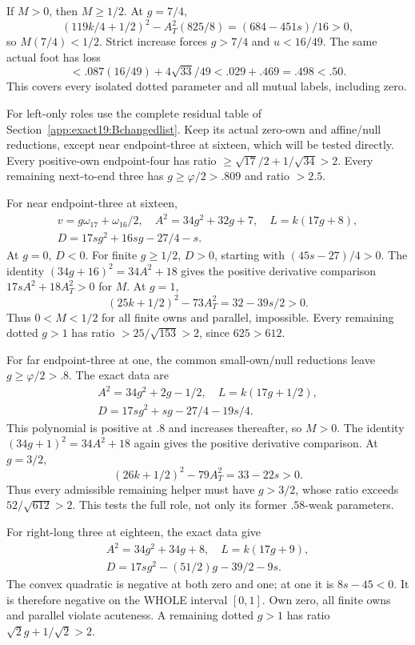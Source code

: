 \documentclass[11pt]{article}
\theoremstyle{definition}
\theoremstyle{remark}
\begin{document}
If \(M>0\), then \(M\ge1/2\).
At \(g=7/4\),
\[
 (119k/4+1/2)^2-A_T^2(825/8)
                         =(684-451s)/16>0 ,
\]
so \(M(7/4)<1/2\).
Strict increase forces \(g>7/4\)
and \(u<16/49\).
The same actual foot has loss
\[
          <.087(16/49)+4\sqrt{33}/49<.029+.469=.498<.50 .
\]
This covers every isolated dotted
parameter and all mutual labels,
including zero.

For left-only roles use the
complete residual table of
Section~\ref{app:exact19:Bchangedlist}.
Keep its actual zero-own and
affine/null reductions, except
near endpoint-three at sixteen,
which will be tested directly.
Every positive-own endpoint-four
has ratio
\(\ge\sqrt{17}/2+1/\sqrt{34}>2\).
Every remaining next-to-end
three has \(g\ge\varphi/2>.809\)
and ratio \(>2.5\).

For near endpoint-three at sixteen,
\[
\begin{gathered}
 v=g\omega_{17}+\omega_{16}/2,\quad
 A^2=34g^2+32g+7,\quad L=k(17g+8),\\
                   D=17sg^2+16sg-27/4-s .
\end{gathered}
\]
At \(g=0\), \(D<0\).
For finite \(g\ge1/2\), \(D>0\),
starting with \((45s-27)/4>0\).
The identity
\((34g+16)^2=34A^2+18\)
gives the positive derivative
comparison \(17sA^2+18A_T^2>0\)
for \(M\).
At \(g=1\),
\[
                         (25k+1/2)^2-73A_T^2=32-39s/2>0 .
\]
Thus \(0<M<1/2\) for all finite
owns and parallel, impossible.
Every remaining dotted \(g>1\)
has ratio \(>25/\sqrt{153}>2\),
since \(625>612\).

For far endpoint-three at one,
the common small-own/null
reductions leave \(g\ge\varphi/2>.8\).
The exact data are
\[
\begin{gathered}
 A^2=34g^2+2g-1/2,\quad L=k(17g+1/2),\\
                   D=17sg^2+sg-27/4-19s/4 .
\end{gathered}
\]
This polynomial is positive at
\(.8\) and increases thereafter,
so \(M>0\).
The identity
\((34g+1)^2=34A^2+18\)
again gives the positive derivative
comparison.
At \(g=3/2\),
\[
                         (26k+1/2)^2-79A_T^2=33-22s>0 .
\]
Thus every admissible remaining
helper must have \(g>3/2\),
whose ratio exceeds
\(52/\sqrt{612}>2\).
This tests the full role, not
only its former \(.58\)-weak
parameters.

For right-long three at eighteen,
the exact data give
\[
\begin{gathered}
 A^2=34g^2+34g+8,\quad L=k(17g+9),\\
                   D=17sg^2-(51/2)g-39/2-9s .
\end{gathered}
\]
The convex quadratic is negative
at both zero and one; at one
it is \(8s-45<0\).
It is therefore negative on the
WHOLE interval \([0,1]\).
Own zero, all finite owns and
parallel violate acuteness.
A remaining dotted \(g>1\)
has ratio \(\sqrt2g+1/\sqrt2>2\).
\end{document}
